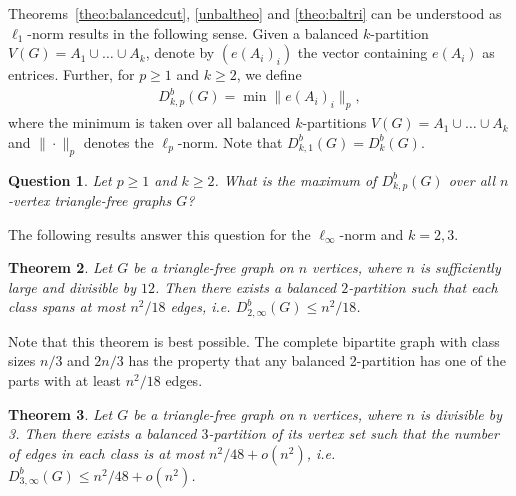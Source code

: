 \documentclass[11pt]{article}
\newtheorem{theo}{Theorem}
\newtheorem{ques}[theo]{Question}
\theoremstyle{definition}
\numberwithin{theo}{section}
\begin{document}
Theorems~\ref{theo:balancedcut}, \ref{unbaltheo} and \ref{theo:baltri} can be understood as $\ell_1$-norm results in the following sense. Given a balanced $k$-partition $V(G)=A_1\cup\ldots \cup A_k$, denote by $(e(A_i)_i)$ the vector containing $e(A_i)$ as entrices. Further, for $p\geq 1$ and $k\geq 2$, we define
\begin{align*}
    D_{k,p}^b(G)=\min \|e(A_i)_i\|_p,
\end{align*}
where the minimum is taken over all balanced $k$-partitions $V(G)=A_1\cup\ldots \cup A_k$ and $\|\cdot\|_p$ denotes the $\ell_p$-norm. Note that $D_{k,1}^b(G)=D_{k}^b(G)$.
\begin{ques}
Let $p\geq 1$ and $k\geq2$. What is the maximum of $D_{k,p}^b(G)$ over all $n$-vertex triangle-free graphs $G$?
\end{ques}
The following results answer this question for the $\ell_\infty$-norm and $k=2,3$.
\begin{theo}
\label{theo:maxbip}
Let $G$ be a triangle-free graph on $n$ vertices, where $n$ is sufficiently large and divisible by $12$. Then there exists a balanced $2$-partition such that each class spans at most $n^2/18$ edges, i.e. $D_{2,\infty}^b(G)\leq n^2/18$.
\end{theo}
Note that this theorem is best possible. The complete bipartite graph with class sizes $n/3$ and $2n/3$ has the property that any balanced 2-partition has one of the parts with at least $n^2/18$ edges. 
\begin{theo}
\label{theo:maxtrip}
Let $G$ be a triangle-free graph on $n$ vertices, where $n$ is divisible by 3. Then there exists a balanced $3$-partition of its vertex set such that the number of edges in each class is at most $n^2/48+o(n^2)$, i.e. $D_{3,\infty}^b(G)\leq n^2/48+o(n^2)$.
\end{theo}

\end{document}
